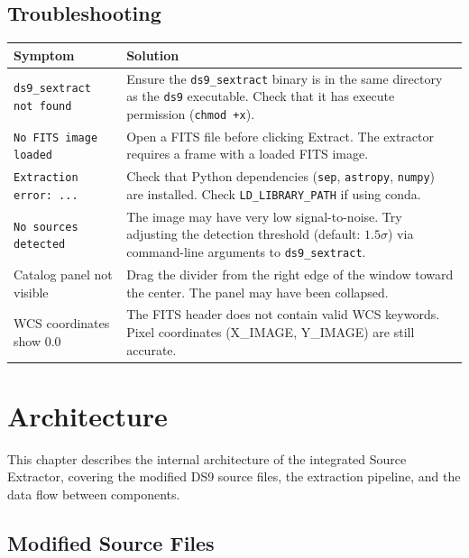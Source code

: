 \documentclass[11pt,fleqn]{book}
\newcommand{\ds}{\texttt{ds9}}
\newcommand{\sextract}{\texttt{ds9\_sextract}}
\begin{document}
\section{Troubleshooting}

\begin{center}
\begin{longtable}{L{4.5cm} L{8.5cm}}
\toprule
\textbf{Symptom} & \textbf{Solution} \\
\midrule
\endhead
\texttt{ds9\_sextract not found} & Ensure the \sextract{} binary is in the same directory as the \ds{} executable. Check that it has execute permission (\texttt{chmod +x}). \\
\midrule
\texttt{No FITS image loaded} & Open a FITS file before clicking Extract. The extractor requires a frame with a loaded FITS image. \\
\midrule
\texttt{Extraction error: ...} & Check that Python dependencies (\texttt{sep}, \texttt{astropy}, \texttt{numpy}) are installed. Check \texttt{LD\_LIBRARY\_PATH} if using conda. \\
\midrule
\texttt{No sources detected} & The image may have very low signal-to-noise. Try adjusting the detection threshold (default: $1.5\sigma$) via command-line arguments to \sextract{}. \\
\midrule
Catalog panel not visible & Drag the divider from the right edge of the window toward the center. The panel may have been collapsed. \\
\midrule
WCS coordinates show 0.0 & The FITS header does not contain valid WCS keywords. Pixel coordinates (X\_IMAGE, Y\_IMAGE) are still accurate. \\
\bottomrule
\end{longtable}
\end{center}


\chapter{Architecture}
\label{ch:architecture}

This chapter describes the internal architecture of the integrated Source Extractor, covering the modified DS9 source files, the extraction pipeline, and the data flow between components.

\section{Modified Source Files}
\end{document}
